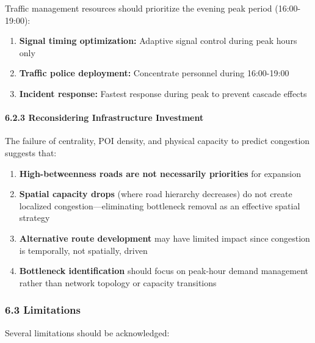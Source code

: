 \documentclass[
  12pt,
]{article}
\providecommand{\tightlist}{%
  \setlength{\itemsep}{0pt}\setlength{\parskip}{0pt}}
\begin{document}
Traffic management resources should prioritize the evening peak period (16:00-19:00):

\begin{enumerate}
\def\labelenumi{\arabic{enumi}.}
\tightlist
\item
  \textbf{Signal timing optimization:} Adaptive signal control during peak hours only
\item
  \textbf{Traffic police deployment:} Concentrate personnel during 16:00-19:00
\item
  \textbf{Incident response:} Fastest response during peak to prevent cascade effects
\end{enumerate}

\paragraph{6.2.3 Reconsidering Infrastructure Investment}\label{reconsidering-infrastructure-investment}

The failure of centrality, POI density, and physical capacity to predict congestion suggests that:

\begin{enumerate}
\def\labelenumi{\arabic{enumi}.}
\tightlist
\item
  \textbf{High-betweenness roads are not necessarily priorities} for expansion
\item
  \textbf{Spatial capacity drops} (where road hierarchy decreases) do not create localized congestion---eliminating bottleneck removal as an effective spatial strategy
\item
  \textbf{Alternative route development} may have limited impact since congestion is temporally, not spatially, driven
\item
  \textbf{Bottleneck identification} should focus on peak-hour demand management rather than network topology or capacity transitions
\end{enumerate}

\subsubsection{6.3 Limitations}\label{limitations}

Several limitations should be acknowledged:
\end{document}
